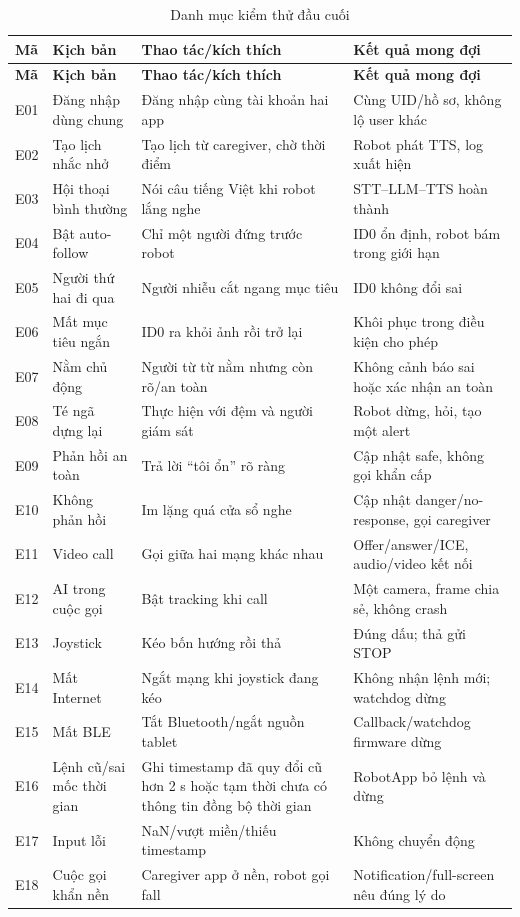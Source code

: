 \begin{longtable}{|p{1.4cm}|p{4.0cm}|p{4.4cm}|p{3.5cm}|}
\caption{Danh mục kiểm thử đầu cuối}\label{tab:e2e_tests}\\
\hline
\textbf{Mã} & \textbf{Kịch bản} & \textbf{Thao tác/kích thích} & \textbf{Kết quả mong đợi} \\
\hline
\endfirsthead
\hline
\textbf{Mã} & \textbf{Kịch bản} & \textbf{Thao tác/kích thích} & \textbf{Kết quả mong đợi} \\
\hline
\endhead
E01 & Đăng nhập dùng chung & Đăng nhập cùng tài khoản hai app & Cùng UID/hồ sơ, không lộ user khác \\
\hline
E02 & Tạo lịch nhắc nhở & Tạo lịch từ caregiver, chờ thời điểm & Robot phát TTS, log xuất hiện \\
\hline
E03 & Hội thoại bình thường & Nói câu tiếng Việt khi robot lắng nghe & STT--LLM--TTS hoàn thành \\
\hline
E04 & Bật auto-follow & Chỉ một người đứng trước robot & ID0 ổn định, robot bám trong giới hạn \\
\hline
E05 & Người thứ hai đi qua & Người nhiễu cắt ngang mục tiêu & ID0 không đổi sai \\
\hline
E06 & Mất mục tiêu ngắn & ID0 ra khỏi ảnh rồi trở lại & Khôi phục trong điều kiện cho phép \\
\hline
E07 & Nằm chủ động & Người từ từ nằm nhưng còn rõ/an toàn & Không cảnh báo sai hoặc xác nhận an toàn \\
\hline
E08 & Té ngã dựng lại & Thực hiện với đệm và người giám sát & Robot dừng, hỏi, tạo một alert \\
\hline
E09 & Phản hồi an toàn & Trả lời ``tôi ổn'' rõ ràng & Cập nhật safe, không gọi khẩn cấp \\
\hline
E10 & Không phản hồi & Im lặng quá cửa sổ nghe & Cập nhật danger/no-response, gọi caregiver \\
\hline
E11 & Video call & Gọi giữa hai mạng khác nhau & Offer/answer/ICE, audio/video kết nối \\
\hline
E12 & AI trong cuộc gọi & Bật tracking khi call & Một camera, frame chia sẻ, không crash \\
\hline
E13 & Joystick & Kéo bốn hướng rồi thả & Đúng dấu; thả gửi STOP \\
\hline
E14 & Mất Internet & Ngắt mạng khi joystick đang kéo & Không nhận lệnh mới; watchdog dừng \\
\hline
E15 & Mất BLE & Tắt Bluetooth/ngắt nguồn tablet & Callback/watchdog firmware dừng \\
\hline
E16 & Lệnh cũ/sai mốc thời gian & Ghi timestamp đã quy đổi cũ hơn 2 s hoặc tạm thời chưa có thông tin đồng bộ thời gian & RobotApp bỏ lệnh và dừng \\
\hline
E17 & Input lỗi & NaN/vượt miền/thiếu timestamp & Không chuyển động \\
\hline
E18 & Cuộc gọi khẩn nền & Caregiver app ở nền, robot gọi fall & Notification/full-screen nêu đúng lý do \\
\hline
\end{longtable}

